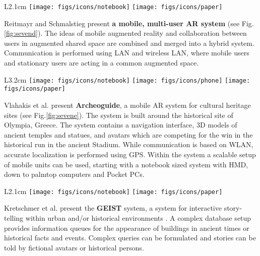 \documentclass[12pt,a4paper]{article}
\begin{document}
\vspace{0.1in}

\begin{wrapfigure}{L}{2.1cm}
	\vspace{-10pt}	
	\texttt{[image: figs/icons/notebook]}
	\texttt{[image: figs/icons/paper]}	
	\vspace{-20pt}		
\end{wrapfigure}
\noindent Reitmayr and Schmalstieg present \textbf{a mobile, multi-user AR system} \cite{Reitmayr01} (see Fig.\ref{fig:sevend}). The ideas of mobile augmented reality and collaboration between users in augmented shared space are combined and merged into a hybrid system. Communication is performed using LAN and wireless LAN, where mobile users and stationary users are acting in a common augmented space.

\vspace{0.1in}

\begin{wrapfigure}{L}{3.2cm}
	\vspace{-15pt}	
	\texttt{[image: figs/icons/notebook]}
	\texttt{[image: figs/icons/phone]}
	\texttt{[image: figs/icons/paper]}		
	\vspace{-25pt}		
\end{wrapfigure}
\noindent Vlahakis et al. present \textbf{Archeoguide}, a mobile AR system for cultural heritage sites \cite{Vlahakis2001} (see Fig.\ref{fig:sevene}). The system is built around the historical site of Olympia, Greece. The system contains a navigation interface, 3D models of ancient temples and statues, and avatars which are competing for the win in the historical run in the ancient Stadium. While communication is based on WLAN, accurate localization is performed using GPS. Within the system a scalable setup of mobile units can be used, starting with a notebook sized system with HMD, down to palmtop computers and Pocket PCs.

\vspace{0.1in}

\begin{wrapfigure}{L}{2.1cm}
	\vspace{-10pt}	
	\texttt{[image: figs/icons/notebook]}
	\texttt{[image: figs/icons/paper]}	
	\vspace{-20pt}		
\end{wrapfigure}
\noindent Kretschmer et al. present the \textbf{GEIST} system, a system for interactive story-telling within urban and/or historical environments \cite{Kretschmer01}. A complex database setup provides information queues for the appearance of buildings in ancient times or historical facts and events. Complex queries can be formulated and stories can be told by fictional avatars or historical persons.
\end{document}
